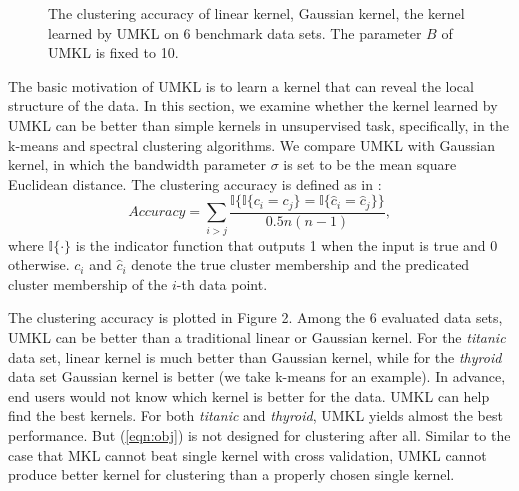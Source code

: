 \begin{figure}[!ht]\hspace{-0.1in}
\begin{center}
\caption{The clustering accuracy of linear kernel, Gaussian kernel, the kernel learned by UMKL on 6 benchmark data sets. The parameter $B$ of UMKL is fixed to 10.}
\end{center}
\end{figure}

The basic motivation of UMKL is to learn a kernel that can reveal the local structure of the data. In this section, we examine whether the kernel learned by UMKL can be better than simple kernels in unsupervised task, specifically, in the k-means and spectral clustering algorithms. We compare UMKL with Gaussian kernel, in which the bandwidth parameter $\sigma$ is set to be the mean square Euclidean distance. The clustering accuracy is defined as in \cite{nips/XingNJR02}:
\[
Accuracy = \sum_{i>j} \frac{ \mathbb I\big\{\mathbb I\{c_i=c_j\}=\mathbb I\{\hat{c}_i=\hat{c}_j\} \big\} } {0.5n(n - 1)},
\]
where $\mathbb I\{\cdot\}$ is the indicator function that outputs 1 when the input is true and 0 otherwise. $c_i$ and $\hat{c}_i$ denote the true cluster membership and the predicated cluster membership of the $i$-th data point.

The clustering accuracy is plotted in Figure 2. Among the 6 evaluated data sets, UMKL can be better than a traditional linear or Gaussian kernel. For the {\em titanic} data set, linear kernel is much better than Gaussian kernel, while for the {\em thyroid} data set Gaussian kernel is better (we take k-means for an example). In advance, end users would not know which kernel is better for the data. UMKL can help find the best kernels. For both {\em titanic} and {\em thyroid}, UMKL yields almost the best performance. But (\ref{eqn:obj}) is not designed for clustering after all. Similar to the case that MKL cannot beat single kernel with cross validation, UMKL cannot produce better kernel for clustering than a properly chosen single kernel.

